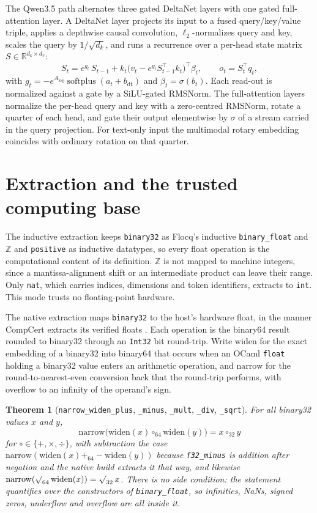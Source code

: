 \documentclass[11pt]{article}
\theoremstyle{plain}
\newtheorem{theorem}{Theorem}[section]
\theoremstyle{definition}
\newcommand{\code}[1]{\texttt{#1}}
\begin{document}
The Qwen3.5 path alternates three gated DeltaNet layers \cite{gateddeltanet}
with one gated full-attention layer. A DeltaNet layer projects its input to a
fused query/key/value triple, applies a depthwise causal convolution,
$\ell_2$-normalizes query and key, scales the query by $1/\sqrt{d_k}$, and runs
a recurrence over a per-head state matrix $S \in \mathbb{R}^{d_k \times d_v}$:
\[
  S_t = e^{g_t}\,S_{t-1}
        + k_t\big(v_t - e^{g_t}S_{t-1}^{\top}k_t\big)^{\!\top}\!\beta_t,
  \qquad
  o_t = S_t^{\top} q_t ,
\]
with $g_t = -e^{A_{\log}}\operatorname{softplus}(a_t + b_{\mathrm{dt}})$ and
$\beta_t = \sigma(b_t)$. Each read-out is normalized against a gate by a
SiLU-gated RMSNorm. The full-attention layers normalize the per-head query and
key with a zero-centred RMSNorm, rotate a quarter of each head, and gate their
output elementwise by $\sigma$ of a stream carried in the query projection. For
text-only input the multimodal rotary embedding coincides with ordinary rotation
on that quarter.

\section{Extraction and the trusted computing base}
\label{sec:tcb}

The inductive extraction keeps \code{binary32} as Flocq's inductive
\code{binary\_float} and $\mathbb{Z}$ and \code{positive} as inductive
datatypes, so every float operation is the computational content of its
definition. $\mathbb{Z}$ is not mapped to machine integers, since a
mantissa-alignment shift or an intermediate product can leave their range. Only
\code{nat}, which carries indices, dimensions and token identifiers, extracts
to \code{int}. This mode trusts no floating-point hardware.

The native extraction maps \code{binary32} to the host's hardware float, in the
manner CompCert extracts its verified floats \cite{compcertfp}. Each operation
is the binary64 result rounded to binary32 through an \code{Int32} bit
round-trip. Write $\mathrm{widen}$ for the exact embedding of a binary32 into
binary64 that occurs when an OCaml \code{float} holding a binary32 value enters
an arithmetic operation, and $\mathrm{narrow}$ for the round-to-nearest-even
conversion back that the round-trip performs, with overflow to an infinity of
the operand's sign.

\begin{theorem}[\code{narrow\_widen\_plus}, \code{\_minus}, \code{\_mult}, \code{\_div}, \code{\_sqrt}]
\label{thm:narrow}
For all binary32 values $x$ and $y$,
\[
  \mathrm{narrow}\bigl(\mathrm{widen}(x) \mathbin{\circ_{64}} \mathrm{widen}(y)\bigr)
  = x \mathbin{\circ_{32}} y
\]
for $\circ \in \{+, \times, \div\}$, with subtraction the case
$\mathrm{narrow}(\mathrm{widen}(x) +_{64} -\mathrm{widen}(y))$ because
\code{f32\_minus} is addition after negation and the native build extracts it
that way, and likewise
$\mathrm{narrow}(\sqrt{\vphantom{x}}_{64}\,\mathrm{widen}(x)) = \sqrt{\vphantom{x}}_{32}\,x$.
There is no side condition: the statement quantifies over the constructors of
\code{binary\_float}, so infinities, NaNs, signed zeros, underflow and overflow
are all inside it.
\end{theorem}
\end{document}
